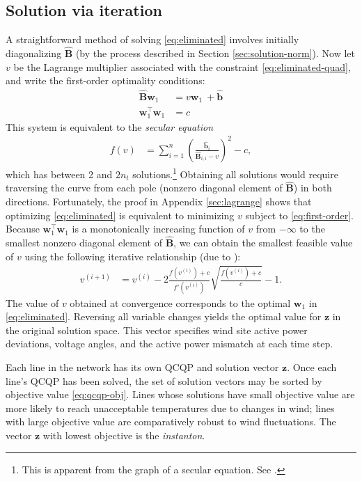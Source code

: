 \documentclass[journal,twoside]{IEEEtran}
\renewcommand{\vec}[1]{\mathbf{#1}}
\begin{document}
\subsection{Solution via iteration}\label{sec:solution-enumeration}
A straightforward method of solving \eqref{eq:eliminated} involves initially diagonalizing $\hat{\mathbf{B}}$ (by the process described in Section \ref{sec:solution-norm}). Now let $v$ be the Lagrange multiplier associated with the constraint \eqref{eq:eliminated-quad}, and write the first-order optimality conditions:
\begin{subequations}\label{eq:first-order}
\begin{align}
\label{eq:kkt} \hat{\mathbf{B}}\vec{w}_1 &= v\vec{w}_1~ + \hat{\vec{b}} \\
\mathbf{w}_1^\top \mathbf{w}_1 &= c
\end{align}
\end{subequations}
This system is equivalent to the \textit{secular equation}
\begin{align*}
f(v) &= \sum_{i=1}^n \left(\frac{\hat{\mathbf{b}}_i}{\hat{\mathbf{B}}_{i,i}-v}\right)^2 - c,
\end{align*}
which has between 2 and $2n_t$ solutions.\footnote{This is apparent from the graph of a secular equation. See \cite{gander1989}.} Obtaining all solutions would require traversing the curve from each pole (nonzero diagonal element of $\hat{\mathbf{B}}$) in both directions. Fortunately, the proof in Appendix \ref{sec:lagrange} shows that optimizing \eqref{eq:eliminated} is equivalent to minimizing $v$ subject to \eqref{eq:first-order}. Because $\mathbf{w}_1^\top \mathbf{w}_1$ is a monotonically increasing function of $v$ from $-\infty$ to the smallest nonzero diagonal element of $\hat{\mathbf{B}}$, we can obtain the smallest feasible value of $v$ using the following iterative relationship (due to \cite{gander1989}):
\begin{align*}
v^{(i+1)} &= v^{(i)} - 2\frac{f\left(v^{(i)}\right) + c}{f'\left(v^{(i)}\right)}\sqrt{\frac{f\left(v^{(i)}\right) + c}{c}} - 1.
\end{align*}
The value of $v$ obtained at convergence corresponds to the optimal $\mathbf{w}_1$ in \eqref{eq:eliminated}. Reversing all variable changes yields the optimal value for $\mathbf{z}$ in the original solution space. This vector specifies wind site active power deviations, voltage angles, and the active power mismatch at each time step.

Each line in the network has its own QCQP and solution vector $\mathbf{z}$. Once each line's QCQP has been solved, the set of solution vectors may be sorted by objective value \eqref{eq:qcqp-obj}. Lines whose solutions have small objective value are more likely to reach unacceptable temperatures due to changes in wind; lines with large objective value are comparatively robust to wind fluctuations. The vector $\mathbf{z}$ with lowest objective is the \textit{instanton}.
\end{document}
